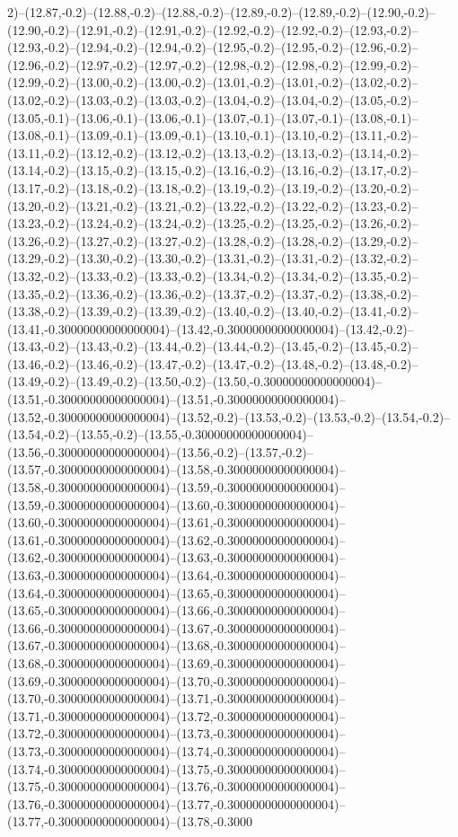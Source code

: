 2)--(12.87,-0.2)--(12.88,-0.2)--(12.88,-0.2)--(12.89,-0.2)--(12.89,-0.2)--(12.90,-0.2)--(12.90,-0.2)--(12.91,-0.2)--(12.91,-0.2)--(12.92,-0.2)--(12.92,-0.2)--(12.93,-0.2)--(12.93,-0.2)--(12.94,-0.2)--(12.94,-0.2)--(12.95,-0.2)--(12.95,-0.2)--(12.96,-0.2)--(12.96,-0.2)--(12.97,-0.2)--(12.97,-0.2)--(12.98,-0.2)--(12.98,-0.2)--(12.99,-0.2)--(12.99,-0.2)--(13.00,-0.2)--(13.00,-0.2)--(13.01,-0.2)--(13.01,-0.2)--(13.02,-0.2)--(13.02,-0.2)--(13.03,-0.2)--(13.03,-0.2)--(13.04,-0.2)--(13.04,-0.2)--(13.05,-0.2)--(13.05,-0.1)--(13.06,-0.1)--(13.06,-0.1)--(13.07,-0.1)--(13.07,-0.1)--(13.08,-0.1)--(13.08,-0.1)--(13.09,-0.1)--(13.09,-0.1)--(13.10,-0.1)--(13.10,-0.2)--(13.11,-0.2)--(13.11,-0.2)--(13.12,-0.2)--(13.12,-0.2)--(13.13,-0.2)--(13.13,-0.2)--(13.14,-0.2)--(13.14,-0.2)--(13.15,-0.2)--(13.15,-0.2)--(13.16,-0.2)--(13.16,-0.2)--(13.17,-0.2)--(13.17,-0.2)--(13.18,-0.2)--(13.18,-0.2)--(13.19,-0.2)--(13.19,-0.2)--(13.20,-0.2)--(13.20,-0.2)--(13.21,-0.2)--(13.21,-0.2)--(13.22,-0.2)--(13.22,-0.2)--(13.23,-0.2)--(13.23,-0.2)--(13.24,-0.2)--(13.24,-0.2)--(13.25,-0.2)--(13.25,-0.2)--(13.26,-0.2)--(13.26,-0.2)--(13.27,-0.2)--(13.27,-0.2)--(13.28,-0.2)--(13.28,-0.2)--(13.29,-0.2)--(13.29,-0.2)--(13.30,-0.2)--(13.30,-0.2)--(13.31,-0.2)--(13.31,-0.2)--(13.32,-0.2)--(13.32,-0.2)--(13.33,-0.2)--(13.33,-0.2)--(13.34,-0.2)--(13.34,-0.2)--(13.35,-0.2)--(13.35,-0.2)--(13.36,-0.2)--(13.36,-0.2)--(13.37,-0.2)--(13.37,-0.2)--(13.38,-0.2)--(13.38,-0.2)--(13.39,-0.2)--(13.39,-0.2)--(13.40,-0.2)--(13.40,-0.2)--(13.41,-0.2)--(13.41,-0.30000000000000004)--(13.42,-0.30000000000000004)--(13.42,-0.2)--(13.43,-0.2)--(13.43,-0.2)--(13.44,-0.2)--(13.44,-0.2)--(13.45,-0.2)--(13.45,-0.2)--(13.46,-0.2)--(13.46,-0.2)--(13.47,-0.2)--(13.47,-0.2)--(13.48,-0.2)--(13.48,-0.2)--(13.49,-0.2)--(13.49,-0.2)--(13.50,-0.2)--(13.50,-0.30000000000000004)--(13.51,-0.30000000000000004)--(13.51,-0.30000000000000004)--(13.52,-0.30000000000000004)--(13.52,-0.2)--(13.53,-0.2)--(13.53,-0.2)--(13.54,-0.2)--(13.54,-0.2)--(13.55,-0.2)--(13.55,-0.30000000000000004)--(13.56,-0.30000000000000004)--(13.56,-0.2)--(13.57,-0.2)--(13.57,-0.30000000000000004)--(13.58,-0.30000000000000004)--(13.58,-0.30000000000000004)--(13.59,-0.30000000000000004)--(13.59,-0.30000000000000004)--(13.60,-0.30000000000000004)--(13.60,-0.30000000000000004)--(13.61,-0.30000000000000004)--(13.61,-0.30000000000000004)--(13.62,-0.30000000000000004)--(13.62,-0.30000000000000004)--(13.63,-0.30000000000000004)--(13.63,-0.30000000000000004)--(13.64,-0.30000000000000004)--(13.64,-0.30000000000000004)--(13.65,-0.30000000000000004)--(13.65,-0.30000000000000004)--(13.66,-0.30000000000000004)--(13.66,-0.30000000000000004)--(13.67,-0.30000000000000004)--(13.67,-0.30000000000000004)--(13.68,-0.30000000000000004)--(13.68,-0.30000000000000004)--(13.69,-0.30000000000000004)--(13.69,-0.30000000000000004)--(13.70,-0.30000000000000004)--(13.70,-0.30000000000000004)--(13.71,-0.30000000000000004)--(13.71,-0.30000000000000004)--(13.72,-0.30000000000000004)--(13.72,-0.30000000000000004)--(13.73,-0.30000000000000004)--(13.73,-0.30000000000000004)--(13.74,-0.30000000000000004)--(13.74,-0.30000000000000004)--(13.75,-0.30000000000000004)--(13.75,-0.30000000000000004)--(13.76,-0.30000000000000004)--(13.76,-0.30000000000000004)--(13.77,-0.30000000000000004)--(13.77,-0.30000000000000004)--(13.78,-0.3000